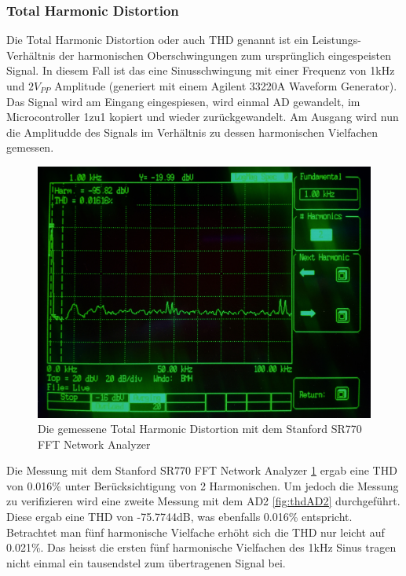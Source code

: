 \subsubsection{Total Harmonic Distortion}
\label{subsubsec:Total Harmonic Distortion}
Die Total Harmonic Distortion oder auch THD genannt ist ein Leistungs-Verhältnis der harmonischen Oberschwingungen zum ursprünglich  eingespeisten Signal. In diesem Fall ist das eine Sinusschwingung mit einer Frequenz von 1kHz und $2V_{PP}$ Amplitude (generiert mit einem Agilent 33220A Waveform Generator). Das Signal wird am Eingang eingespiesen, wird einmal AD gewandelt, im Microcontroller 1zu1 kopiert und wieder zurückgewandelt. Am Ausgang wird nun die Amplitudde des Signals im Verhältnis zu dessen harmonischen Vielfachen gemessen.

\begin{figure} [H]
\begin{center}
 \includegraphics[scale=0.1]{../graphics/THD.jpg}
 \caption{Die gemessene Total Harmonic Distortion mit dem Stanford SR770 FFT Network Analyzer}
\label{fig:thd}
\end{center}
\end{figure}

Die Messung mit dem Stanford SR770 FFT Network Analyzer \ref{fig:thd} ergab eine THD von 0.016\% unter Berücksichtigung von 2 Harmonischen.
Um jedoch die Messung zu verifizieren wird eine zweite Messung mit dem AD2 \ref{fig:thdAD2}  durchgeführt. Diese ergab eine THD von -75.7744dB, was ebenfalls 0.016\% entspricht. Betrachtet man fünf harmonische Vielfache erhöht sich die THD nur leicht auf 0.021\%. Das heisst die ersten fünf harmonische Vielfachen des 1kHz Sinus tragen nicht einmal ein tausendstel zum übertragenen Signal bei.

